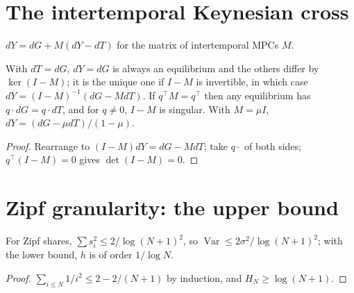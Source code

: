 \section{The intertemporal Keynesian cross}

\begin{definition}[IKC]
\label{def:ikc}
\leanok
$dY=dG+M(dY-dT)$ for the matrix of intertemporal MPCs $M$.
\end{definition}

\begin{theorem}[IKC]
\label{thm:ikc}
\leanok
{}
With $dT=dG$, $dY=dG$ is always an equilibrium and the others differ by $\ker(I-M)$; it is the unique one if $I-M$ is
invertible, in which case $dY=(I-M)^{-1}(dG-MdT)$. If $q^\top M=q^\top$ then any equilibrium has $q\cdot dG=q\cdot dT$, and for
$q\ne0$, $I-M$ is singular. With $M=\mu I$, $dY=(dG-\mu dT)/(1-\mu)$.
\end{theorem}
\begin{proof}
\leanok
Rearrange to $(I-M)dY=dG-MdT$; take $q\cdot$ of both sides; $q^\top(I-M)=0$ gives $\det(I-M)=0$.
\end{proof}

\section{Zipf granularity: the upper bound}

\begin{theorem}
\label{thm:zipf_upper}
\leanok
{}
For Zipf shares, $\sum s_i^2\le2/\log(N+1)^2$, so $\operatorname{Var}\le2\sigma^2/\log(N+1)^2$; with the lower bound, $h$ is of
order $1/\log N$.
\end{theorem}
\begin{proof}
\leanok
$\sum_{i\le N}1/i^2\le2-2/(N+1)$ by induction, and $H_N\ge\log(N+1)$.
\end{proof}
